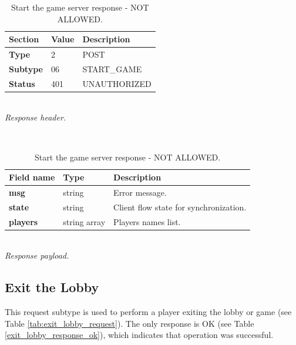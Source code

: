 \documentclass[english, sem, kiv, he, iso690alph, pdf, viewonly]{fasthesis}
\begin{document}
\begin{table}[h!]
	\centering
	\begin{minipage}[b]{1.0\textwidth}
		\centering
		\begin{tabular}{|l|l|l|}
			\hline
			\textbf{Section} & \textbf{Value} & \textbf{Description} \\ \hline
			\textbf{Type} & 2 & \footnotesize{POST} \\ \hline
			\textbf{Subtype} & 06 & \footnotesize{START\_GAME}  \\ \hline
			\textbf{Status} & 401 & \footnotesize{UNAUTHORIZED} \\ \hline
		\end{tabular} \\
		\textit{Response header.}
	\end{minipage} 
	\\
	\vspace{10pt}
	\begin{minipage}[b]{1.0\textwidth}
		\centering
		\begin{tabular}{|l|l|l|}
			\hline
			\textbf{Field name} & \textbf{Type} & \textbf{Description} \\ \hline
            \textbf{msg} & string & Error message. \\ \hline
			\textbf{state} & string & Client flow state for synchronization. \\ \hline
            \textbf{players} & string array & Players names list. \\ \hline
		\end{tabular} \\
		\textit{Response payload.}
	\end{minipage}	
	\caption{Start the game server response - NOT ALLOWED.}
	\label{tab:start_game_response_unauthorized}
\end{table}

\newpage

\subsection{Exit the Lobby}

This request subtype is used to perform a player exiting the lobby or game (see Table \ref{tab:exit_lobby_request}). The only response is OK (see Table \ref{exit_lobby_response_ok}), which indicates that operation was successful.
\end{document}

